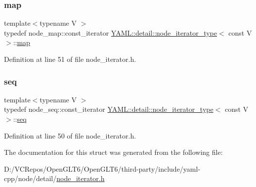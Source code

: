 \subsubsection{\texorpdfstring{map}{map}}
{\footnotesize\ttfamily template$<$typename V $>$ \\
typedef node\+\_\+map\+::const\+\_\+iterator \mbox{\hyperlink{struct_y_a_m_l_1_1detail_1_1node__iterator__type}{Y\+A\+M\+L\+::detail\+::node\+\_\+iterator\+\_\+type}}$<$ const V $>$\+::\mbox{\hyperlink{struct_y_a_m_l_1_1detail_1_1node__iterator__type_3_01const_01_v_01_4_ad48a4ae14361f5cfd81010f1dc004c40}{map}}}



Definition at line 51 of file node\+\_\+iterator.\+h.

\mbox{\label{struct_y_a_m_l_1_1detail_1_1node__iterator__type_3_01const_01_v_01_4_a84aeeaf64232c552dcfca2ffd68e99d4}} 
\subsubsection{\texorpdfstring{seq}{seq}}
{\footnotesize\ttfamily template$<$typename V $>$ \\
typedef node\+\_\+seq\+::const\+\_\+iterator \mbox{\hyperlink{struct_y_a_m_l_1_1detail_1_1node__iterator__type}{Y\+A\+M\+L\+::detail\+::node\+\_\+iterator\+\_\+type}}$<$ const V $>$\+::\mbox{\hyperlink{struct_y_a_m_l_1_1detail_1_1node__iterator__type_3_01const_01_v_01_4_a84aeeaf64232c552dcfca2ffd68e99d4}{seq}}}



Definition at line 50 of file node\+\_\+iterator.\+h.



The documentation for this struct was generated from the following file\+:\begin{DoxyCompactItemize}
\item 
D\+:/\+V\+C\+Repos/\+Open\+G\+L\+T6/\+Open\+G\+L\+T6/third-\/party/include/yaml-\/cpp/node/detail/\mbox{\hyperlink{node__iterator_8h}{node\+\_\+iterator.\+h}}\end{DoxyCompactItemize}
